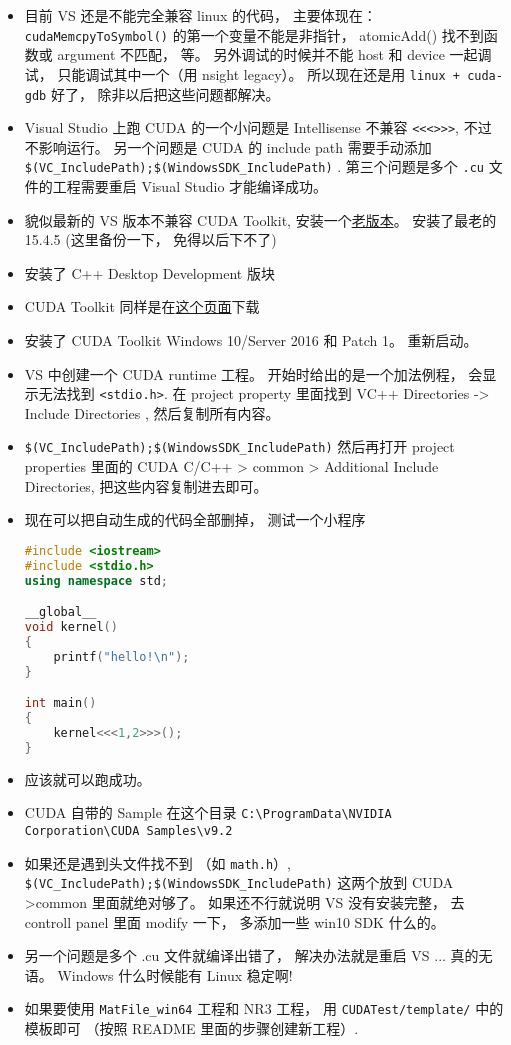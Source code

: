 
\begin{itemize}
\item 目前 VS 还是不能完全兼容 linux 的代码， 主要体现在： \verb|cudaMemcpyToSymbol()| 的第一个变量不能是非指针， atomicAdd() 找不到函数或 argument 不匹配， 等。 另外调试的时候并不能 host 和 device 一起调试， 只能调试其中一个（用 nsight legacy）。 所以现在还是用 \verb|linux + cuda-gdb| 好了， 除非以后把这些问题都解决。
\item Visual Studio 上跑 CUDA 的一个小问题是 Intellisense 不兼容 \verb`<<<>>>`, 不过不影响运行。 另一个问题是 CUDA 的 include path 需要手动添加 \verb`$(VC_IncludePath);$(WindowsSDK_IncludePath)` . 第三个问题是多个 \verb`.cu` 文件的工程需要重启 Visual Studio 才能编译成功。
\item 貌似最新的 VS 版本不兼容 CUDA Toolkit, 安装一个\href{https://docs.microsoft.com/en-us/visualstudio/productinfo/installing-an-earlier-release-of-vs2017}{老版本}。 安装了最老的 15.4.5 (这里备份一下， 免得以后下不了)
\item 安装了 C++ Desktop Development 版块
\item CUDA Toolkit 同样是在\href{https://developer.nvidia.com/cuda-downloads}{这个页面}下载
\item 安装了 CUDA Toolkit Windows 10/Server 2016 和 Patch 1。 重新启动。
\item VS 中创建一个 CUDA runtime 工程。 开始时给出的是一个加法例程， 会显示无法找到 \verb`<stdio.h>`. 在 project property 里面找到 VC++ Directories -> Include Directories , 然后复制所有内容。
\item \verb|$(VC_IncludePath);$(WindowsSDK_IncludePath)| 然后再打开 project properties 里面的 CUDA C/C++ >  common > Additional Include Directories, 把这些内容复制进去即可。
\item 现在可以把自动生成的代码全部删掉， 测试一个小程序
\begin{lstlisting}[language=cpp]
#include <iostream>
#include <stdio.h>
using namespace std;

__global__
void kernel()
{
	printf("hello!\n");
}

int main()
{
	kernel<<<1,2>>>();
}
\end{lstlisting}
\item 应该就可以跑成功。
\item CUDA 自带的 Sample 在这个目录 \verb|C:\ProgramData\NVIDIA Corporation\CUDA Samples\v9.2|
\item 如果还是遇到头文件找不到 （如 \verb`math.h`）, \verb`$(VC_IncludePath);$(WindowsSDK_IncludePath)` 这两个放到 CUDA >common 里面就绝对够了。 如果还不行就说明 VS 没有安装完整， 去 controll panel 里面 modify 一下， 多添加一些 win10 SDK 什么的。
\item 另一个问题是多个 .cu 文件就编译出错了， 解决办法就是重启 VS ... 真的无语。 Windows 什么时候能有 Linux 稳定啊!
\item 如果要使用 \verb|MatFile_win64| 工程和 NR3 工程， 用 \verb|CUDATest/template/| 中的模板即可 （按照 README 里面的步骤创建新工程）.
\end{itemize}
